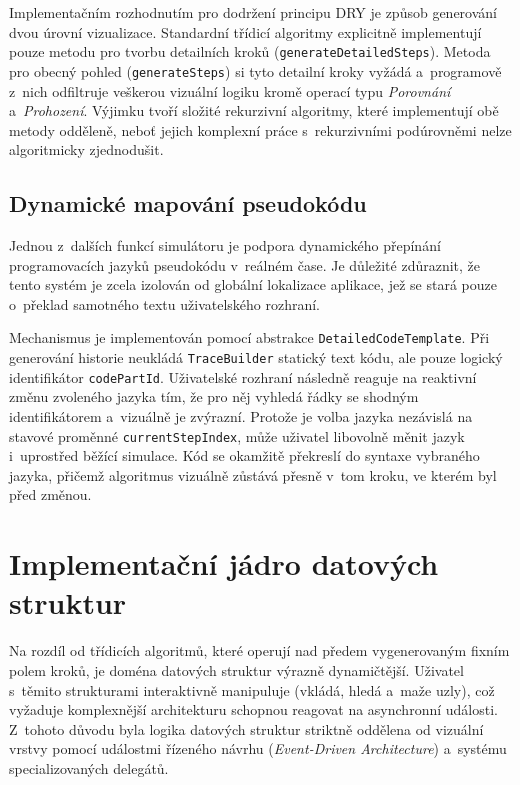 Implementačním rozhodnutím pro dodržení principu DRY je způsob generování dvou úrovní vizualizace.
Standardní třídicí algoritmy explicitně implementují pouze metodu pro tvorbu detailních kroků (\texttt{generateDetailedSteps}).
Metoda pro obecný pohled (\texttt{generateSteps}) si tyto detailní kroky vyžádá a~programově z~nich odfiltruje veškerou vizuální logiku kromě operací typu \textit{Porovnání} a~\textit{Prohození}.
Výjimku tvoří složité rekurzivní algoritmy, které implementují obě metody odděleně, neboť jejich komplexní práce s~rekurzivními podúrovněmi nelze algoritmicky zjednodušit.

\subsection{Dynamické mapování pseudokódu}
\label{subsec:dynamic-pseudocode}

Jednou z~dalších funkcí simulátoru je podpora dynamického přepínání programovacích jazyků pseudokódu v~reálném čase.
Je důležité zdůraznit, že tento systém je zcela izolován od globální lokalizace aplikace, jež se stará pouze o~překlad samotného textu uživatelského rozhraní.

Mechanismus je implementován pomocí abstrakce \texttt{DetailedCodeTemplate}.
Při generování historie neukládá \texttt{TraceBuilder} statický text kódu, ale pouze logický identifikátor \texttt{codePartId}.
Uživatelské rozhraní následně reaguje na reaktivní změnu zvoleného jazyka tím, že pro něj vyhledá řádky se shodným identifikátorem a~vizuálně je zvýrazní.
Protože je volba jazyka nezávislá na stavové proměnné \texttt{currentStepIndex}, může uživatel libovolně měnit jazyk i~uprostřed běžící simulace.
Kód se okamžitě překreslí do syntaxe vybraného jazyka, přičemž algoritmus vizuálně zůstává přesně v~tom kroku, ve kterém byl před změnou.

\section{Implementační jádro datových struktur}
\label{sec:data-structures-core}

Na rozdíl od třídicích algoritmů, které operují nad předem vygenerovaným fixním polem kroků, je doména datových struktur výrazně dynamičtější.
Uživatel s~těmito strukturami interaktivně manipuluje (vkládá, hledá a~maže uzly), což vyžaduje komplexnější architekturu schopnou reagovat na asynchronní události.
Z~tohoto důvodu byla logika datových struktur striktně oddělena od vizuální vrstvy pomocí událostmi řízeného návrhu (\textit{Event-Driven Architecture}) a~systému specializovaných delegátů.

